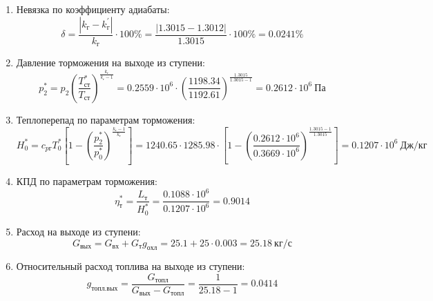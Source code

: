 \documentclass[a4paper,10pt]{article}
\begin{document}
\begin{enumerate}
        \item Невязка по коэффициенту адиабаты:
        \[
            \delta = \frac{ \left| k_г - k_г^\prime \right| }{ k_г } \cdot 100 \%=
                \frac{
                    \left| 1.3015 - 1.3012 \right|
                }{
                    1.3015
                } \cdot 100 \% =
            0.0241 \%
        \]

        \item Давление торможения на выходе из ступени:
        \[
            p_2^* = p_2 \left(
                            \frac{ T_{ст}^* }{ T_{ст} }
                    \right) ^ \frac{ k_г }{ k_г - 1 } =
                 0.2559 \cdot 10^6 \cdot \left(
                            \frac{ 1198.34 }{ 1192.61 }
                    \right) ^
                \frac{ 1.3015 }{ 1.3015 - 1 } =
            0.2612 \cdot 10^6 \ Па
        \]

        \item Теплоперепад по параметрам торможения:
        \[
            H_0^* = c_{pг} T_0^* \left[
                        1 - \left(
                                \frac{p_2^*}{p_0^*}
                            \right) ^
                        \frac{k_г - 1}{k_г}
                    \right] =
            1240.65 \cdot 1285.98 \cdot
                    \left[
                        1 - \left(
                                \frac{
                                    0.2612 \cdot 10^6
                                }{
                                    0.3669 \cdot 10^6
                                }
                            \right) ^
                        \frac{1.3015 - 1}{1.3015}
                    \right] =
            0.1207 \cdot 10^6 \ Дж/кг
        \]

        \item КПД по параметрам торможения:
        \[
            \eta_т^* = \frac{ L_т }{ H_0^* } =
                \frac{
                    0.1088 \cdot 10^6
                }{
                    0.1207 \cdot 10^6 } =
            0.9014
        \]

        \item Расход на выходе из ступени:
        \[
            G_{вых} = G_{вх} + G_т g_{охл} =
                25.1 + 25 \cdot
                0.003 =
            25.18 \ кг/с
        \]

        \item Относительный расход топлива на выходе из ступени:
        \[
            g_{топл.вых} = \frac{ G_{топл} }{ G_{вых} - G_{топл} } =
                 \frac{ 1 }{ 25.18 - 1 } =
            0.0414
        \]


\end{enumerate}
\end{document}
